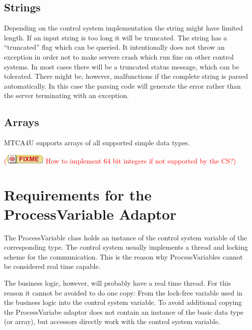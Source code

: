 \documentclass[11pt,a4paper]{scrartcl}
\newcounter{nFixmes}
\newcommand{\fixme}[1]{\addtocounter{nFixmes}{1}\textcolor{red}{(\includegraphics[height=2ex]{fixme} #1)}\xspace}
\begin{document}
\subsection{Strings}

Depending on the control system implementation the string might have limited length. If an input string is too long it will be truncated. The string has a “truncated” flag which can be queried. It intentionally does not throw an exception in order not to make servers crash which run fine on other control systems. In most cases there will be a truncated status message, which can be tolerated. There might be, however, malfunctions if the complete string is parsed automatically. In this case the parsing code will generate the error rather than the server terminating with an exception.

\subsection{Arrays}

MTCA4U supports arrays of all supported simple data types. \fixme{How to implement 64 bit integers if not supported by the CS?}

\section{Requirements for the ProcessVariable Adaptor}\label{section_process_variable_adapter}

The ProcessVariable class holds an instance of the control system variable of the corresponding type. The control system usually implements a thread and locking scheme for the communication. This is the reason why ProcessVariables cannot be considered real time capable.

The business logic, however, will probably have a real time thread. For this reason it cannot be avoided to do one copy: From the lock-free variable used in the business logic into the control system variable. To avoid additional copying the ProcessVariabe adaptor does not contain an instance of the basic data type (or array), but accessors directly work with the control system variable.
\end{document}
